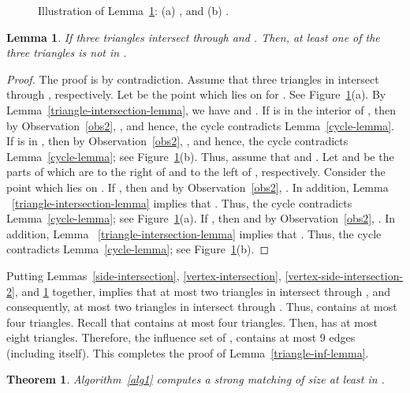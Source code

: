 \documentclass[11pt,a4paper]{article}
\newtheorem{lemma}{Lemma}
\newtheorem{theorem}{Theorem}
\begin{document}
\begin{figure}[htb]
  \centering
\setlength{\tabcolsep}{0in}
  
  \caption{Illustration of Lemma~\ref{vertex-side-intersection-1}: (a) , and (b) .}
\label{three-triangle-fig}
\end{figure}

\begin{lemma}
\label{vertex-side-intersection-1}
If three triangles intersect  through  and . Then, at least one of the three triangles is not in . 
\end{lemma}
\begin{proof}
The proof is by contradiction. Assume that three triangles  in  intersect  through , respectively. Let  be the point which lies on  for . See Figure~\ref{three-triangle-fig}(a). By Lemma~\ref{triangle-intersection-lemma}, we have  and . If  is in the interior of , then by Observation~\ref{obs2}, , and hence, the cycle  contradicts Lemma~\ref{cycle-lemma}. If  is in , then by Observation~\ref{obs2}, , and hence, the cycle  contradicts Lemma~\ref{cycle-lemma}; see Figure~\ref{three-triangle-fig}(b). Thus, assume that  and . Let  and  be the parts of  which are to the right of  and to the left of , respectively. Consider the point  which lies on . 
If , then  and by Observation~\ref{obs2}, . In addition, Lemma ~\ref{triangle-intersection-lemma} implies that . Thus, the cycle  contradicts Lemma~\ref{cycle-lemma}; see Figure~\ref{three-triangle-fig}(a).
If , then  and by Observation~\ref{obs2}, . In addition, Lemma ~\ref{triangle-intersection-lemma} implies that . Thus, the cycle  contradicts Lemma~\ref{cycle-lemma}; see Figure~\ref{three-triangle-fig}(b).
\end{proof}



Putting Lemmas~\ref{side-intersection}, \ref{vertex-intersection}, \ref{vertex-side-intersection-2}, and \ref{vertex-side-intersection-1} together, implies that at most two triangles in  intersect  through ,  and consequently, at most two triangles in  intersect  through . Thus,  contains at most four triangles. Recall that  contains at most four triangles. Then,  has at most eight triangles. Therefore, the influence set of , contains at most 9 edges (including  itself). This completes the proof of Lemma~\ref{triangle-inf-lemma}. 

\begin{theorem}
\label{half-theta-six-thr}
Algorithm~\ref{alg1} computes a strong matching of size at least  in .
\end{theorem}
\end{document}
